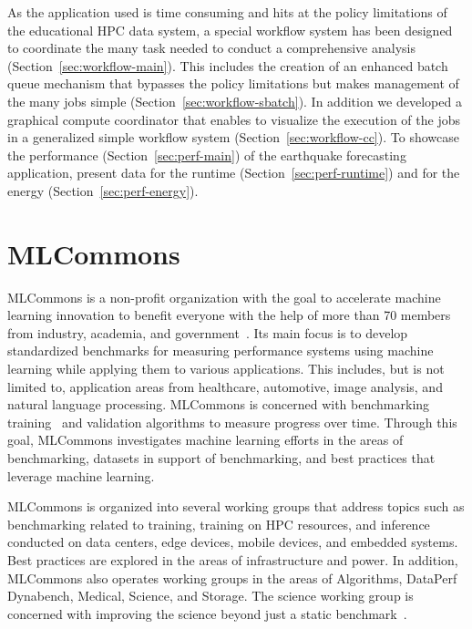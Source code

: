 \documentclass[utf8]{FrontiersinVancouver} %
\begin{document}
As the application used is time consuming and hits at the policy
limitations of the educational HPC data system, a special workflow
system has been designed to coordinate the many task needed to conduct
a comprehensive analysis (Section~\ref{sec:workflow-main}). This
includes the creation of an enhanced batch queue mechanism that
bypasses the policy limitations but makes management of the many jobs
simple (Section~\ref{sec:workflow-sbatch}). In addition we developed a
graphical compute coordinator that enables to visualize the execution
of the jobs in a generalized simple workflow system
(Section~\ref{sec:workflow-cc}).  To showcase the performance
(Section~\ref{sec:perf-main}) of the earthquake forecasting
application, present data for the runtime
(Section~\ref{sec:perf-runtime}) and for the energy
(Section~\ref{sec:perf-energy}).






\section{MLCommons}
\label{sec:mlcommons}

MLCommons is a non-profit organization with the goal to
accelerate machine learning innovation to benefit everyone with the
help of more than 70 members from industry, academia, and
government~\citep{www-mlcommons}. Its main focus is to develop standardized
benchmarks for measuring performance systems using machine
learning while applying them to various applications. This includes,
but is not limited to, application areas from healthcare, automotive,
image analysis, and natural language processing. MLCommons is
concerned with benchmarking training~\citep{mlperf-training} and
validation algorithms to measure progress over time. Through this goal,
MLCommons investigates machine learning efforts in the areas of
benchmarking, datasets in support of benchmarking, and best practices
that leverage machine learning.

MLCommons is organized into several working groups that address topics
such as benchmarking related to training, training on HPC resources,
and inference conducted on data centers, edge devices, mobile devices, and
embedded systems. Best practices are explored in the areas of
infrastructure and power. In addition, MLCommons also operates
working groups in the areas of Algorithms, DataPerf Dynabench,
Medical, Science, and Storage. The science working group is concerned
with improving the science beyond just a static
benchmark~\citep{las-22-mlcommons-science}.
\end{document}
